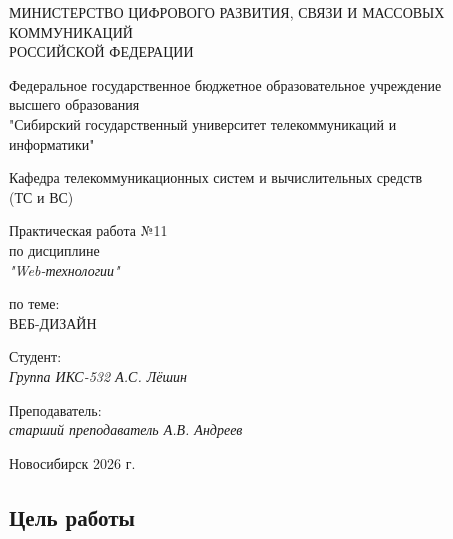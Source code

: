 \documentclass[a4paper,14pt,oneside,openany]{memoir}
\begin{document}
\thispagestyle{empty}

\begin{center}
    МИНИСТЕРСТВО ЦИФРОВОГО РАЗВИТИЯ, СВЯЗИ И МАССОВЫХ \\ КОММУНИКАЦИЙ \\ РОССИЙСКОЙ ФЕДЕРАЦИИ

    \vspace{20pt}

    Федеральное государственное бюджетное образовательное учреждение \\ высшего образования \\
    "Сибирский государственный университет телекоммуникаций и \\ информатики"

    \vspace{20pt}

    Кафедра телекоммуникационных систем и вычислительных средств \\ (ТС и ВС)
\end{center}

\vfill

\begin{center}
    Практическая работа №11 \\
    по дисциплине \\
    \textit{"Web-технологии"}

    \vspace{20pt}

    по теме: \\
    \uppercase{Веб-дизайн}
\end{center}

\vfill

\noindent Студент: \\
\textit{Группа ИКС-532 \hfill А.С. Лёшин}

\vspace{20pt}

\noindent Преподаватель: \\
\textit{старший преподаватель \hfill А.В. Андреев}

\vfill

\begin{center}
    Новосибирск 2026 г.
\end{center}

\newpage
\setcounter{page}{2}
\OnehalfSpacing*

\subsection*{Цель работы}
\end{document}
